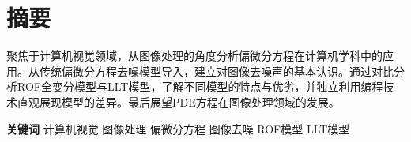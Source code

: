 \chapter{摘要}
聚焦于计算机视觉领域，从图像处理的角度分析偏微分方程在计算机学科中的应用。从传统偏微分方程去噪模型导入，建立对图像去噪声的基本认识。通过对比分析ROF全变分模型与LLT模型，了解不同模型的特点与优劣，并独立利用编程技术直观展现模型的差异。最后展望PDE方程在图像处理领域的发展。


{
    \vspace{1em}
    \setlength{\parindent}{0em}
    \textbf{关键词} \; 计算机视觉 \; 图像处理 \;偏微分方程 \; 图像去噪 \; ROF模型 \; LLT模型  \par
}
